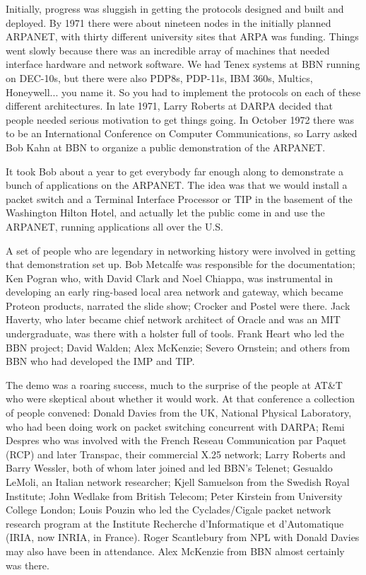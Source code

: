 \documentclass[10pt,a4paper]{scrartcl}
\begin{document}
Initially, progress was sluggish in getting the protocols designed and built and deployed. By 1971 there were about nineteen nodes in the initially planned ARPANET, with thirty different university sites that ARPA was funding. Things went slowly because there was an incredible array of machines that needed interface hardware and network software. We had Tenex systems at BBN running on DEC-10s, but there were also PDP8s, PDP-11s, IBM 360s, Multics, Honeywell... you name it. So you had to implement the protocols on each of these different architectures. In late 1971, Larry Roberts at DARPA decided that people needed serious motivation to get things going. In October 1972 there was to be an International Conference on Computer Communications, so Larry asked Bob Kahn at BBN to organize a public demonstration of the ARPANET.

It took Bob about a year to get everybody far enough along to demonstrate a bunch of applications on the ARPANET. The idea was that we would install a packet switch and a Terminal Interface Processor or TIP in the basement of the Washington Hilton Hotel, and actually let the public come in and use the ARPANET, running applications all over the U.S.

A set of people who are legendary in networking history were involved in getting that demonstration set up. Bob Metcalfe was responsible for the documentation; Ken Pogran who, with David Clark and Noel Chiappa, was instrumental in developing an early ring-based local area network and gateway, which became Proteon products, narrated the slide show; Crocker and Postel were there. Jack Haverty, who later became chief network architect of Oracle and was an MIT undergraduate, was there with a holster full of tools. Frank Heart who led the BBN project; David Walden; Alex McKenzie; Severo Ornstein; and others from BBN who had developed the IMP and TIP.

The demo was a roaring success, much to the surprise of the people at AT\&T who were skeptical about whether it would work. At that conference a collection of people convened: Donald Davies from the UK, National Physical Laboratory, who had been doing work on packet switching concurrent with DARPA; Remi Despres who was involved with the French Reseau Communication par Paquet (RCP) and later Transpac, their commercial X.25 network; Larry Roberts and Barry Wessler, both of whom later joined and led BBN's Telenet; Gesualdo LeMoli, an Italian network researcher; Kjell Samuelson from the Swedish Royal Institute; John Wedlake from British Telecom; Peter Kirstein from University College London; Louis Pouzin who led the Cyclades/Cigale packet network research program at the Institute Recherche d'Infor\-matique et d'Automatique (IRIA, now INRIA, in France). Roger Scantlebury from NPL with Donald Davies may also have been in attendance. Alex McKenzie from BBN almost certainly was there.
\end{document}
